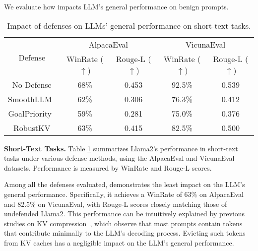 We evaluate how \rkv impacts LLM's general performance on benign prompts. 


\begin{table}[ht!]\small
\renewcommand{\arraystretch}{1.1}
\centering
\begin{tabular}{c|c|c|c|c}
\multirow{2}{*}{Defense} & \multicolumn{2}{c|}{AlpacaEval} &  \multicolumn{2}{c}{VicunaEval} \\
\cline{2-5}
& WinRate ($\uparrow$) & Rouge-L ($\uparrow$) & WinRate ($\uparrow$) & Rouge-L ($\uparrow$) \\
\hline
No Defense & 68\% & 0.453 & 92.5\% & 0.539 \\
SmoothLLM~\citep{smoothllm}  & 62\% & 0.306 & 76.3\%& 0.412\\
GoalPriority~\citep{goal-priority}& 59\% & 0.281 & 75.0\% & 0.376 \\
RobustKV & \cellcolor{Red}63\% & \cellcolor{Red}0.415 & \cellcolor{Red}82.5\% & \cellcolor{Red}0.500 \\
\end{tabular}
\caption{Impact of defenses on LLMs' general performance on short-text tasks.}
\label{tab:performance_comparison}
\end{table}

{\bf Short-Text Tasks.} Table \ref{tab:performance_comparison} summarizes Llama2's performance in short-text tasks under various defense methods, using the AlpacaEval and VicunaEval datasets. Performance is measured by WinRate and Rouge-L scores.



Among all the defenses evaluated, \rkv demonstrates the least impact on the LLM's general performance. Specifically, it achieves a WinRate of 63\% on AlpacaEval and 82.5\% on VicunaEval, with Rouge-L scores closely matching those of undefended Llama2. This performance can be intuitively explained by previous studies on KV compression~\citep{scissorhands,fastgen}, which observe that most prompts contain tokens that contribute minimally to the LLM's decoding process. Evicting such tokens from KV caches has a negligible impact on the LLM's general performance.




